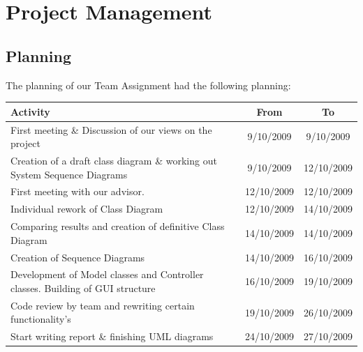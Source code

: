 	\section{Project Management}
		\subsection{Planning}
		The planning of our Team Assignment had the following planning:\\
		\begin{tabular}{p{200 pt}|c|c}
		Activity & From & To\\
		\hline
		First meeting \& Discussion of our views on the project & 9/10/2009 & 9/10/2009\\ \hline
		Creation of a draft class diagram \& working out System Sequence Diagrams & 9/10/2009 & 12/10/2009\\ \hline
		First meeting with our advisor. & 12/10/2009 & 12/10/2009\\ \hline
		Individual rework of Class Diagram & 12/10/2009 & 14/10/2009\\ \hline
		Comparing results and creation of definitive Class Diagram & 14/10/2009 & 14/10/2009\\ \hline
		Creation of Sequence Diagrams & 14/10/2009 & 16/10/2009\\ \hline
		Development of Model classes and Controller classes. Building of GUI structure & 16/10/2009 & 19/10/2009\\ \hline
		Code review by team and rewriting certain functionality's & 19/10/2009 & 26/10/2009\\ \hline
		Start writing report \& finishing UML diagrams & 24/10/2009 & 27/10/2009\\ \hline
		\end{tabular}
